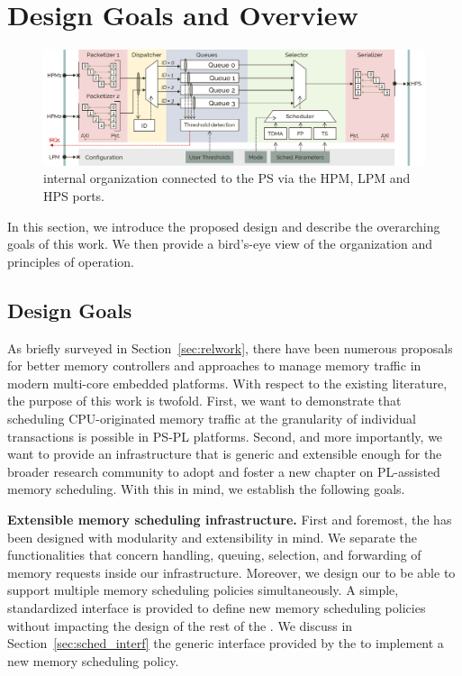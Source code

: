 \section{Design Goals and Overview}\label{sec:overview}

\begin{figure}
  \centering
  \includegraphics[width=1\textwidth]{images/SchIM_diagram.png}
    \caption{\schim internal organization connected to the
      PS via the HPM, LPM and HPS ports.}
  \label{fig:MemorEDF_module_schema}
\end{figure}

In this section, we introduce the proposed \schim design and describe
the overarching goals of this work. We then provide a bird's-eye view
of the \schim organization and principles of operation.

\subsection{Design Goals}\label{sec:design_goals}
As briefly surveyed in Section~\ref{sec:relwork}, there have been
numerous proposals for better memory controllers and approaches to
manage memory traffic in modern multi-core embedded platforms. With
respect to the existing literature, the purpose of this work is
twofold. First, we want to demonstrate that scheduling CPU-originated
memory traffic at the granularity of individual transactions is
possible in PS-PL platforms. Second, and more importantly, we want to
provide an infrastructure that is generic and extensible enough for
the broader research community to adopt and foster a new chapter on
PL-assisted memory scheduling. With this in mind, we establish the
following goals.

\par{\bf Extensible memory scheduling infrastructure.} First and
foremost, the \schim has been designed with modularity and
extensibility in mind. We separate the functionalities that concern
handling, queuing, selection, and forwarding of memory requests inside
our infrastructure. Moreover, we design our \schim to be able to support multiple memory scheduling policies simultaneously. A simple,
standardized interface is provided to define new memory scheduling
policies without impacting the design of the rest of the \schim. We
discuss in Section~\ref{sec:sched_interf} the generic interface
provided by the \schim to implement a new memory scheduling policy.

